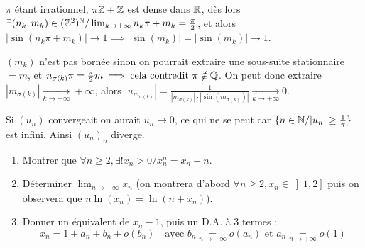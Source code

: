 \begin{solution}
$\pi$ étant irrationnel, $\pi \mathbb Z + \mathbb Z$ est dense dans $\mathbb R$, dès lors $\exists (n_k, m_k) \in (\mathbb Z^2)^\mathbb N / \lim_{k \to +\infty} n_k \pi + m_k = \frac{\pi}{2}$,
et alors $|\sin(n_k \pi + m_k)| \to 1 \implies |\sin(m_k)| = |\sin(m_k)| \to 1$.

$(m_k)$ n'est pas bornée sinon on pourrait extraire une sous-suite stationnaire $= m$, et $n_{\sigma(k)} \pi = \frac{\pi}{2} m \implies \text{cela contredit } \pi \notin \mathbb Q$.
On peut donc extraire $|m_{\sigma(k)}| \xrightarrow[k \to +\infty]{} +\infty$, alors $|u_{m_{\sigma(k)}}| = \frac{1}{|m_{\sigma(k)}| \cdot |\sin(m_{\sigma(k)})|} \xrightarrow[k \to +\infty]{} 0$.

Si $(u_n)$ convergeait on aurait $u_n \to 0$, ce qui ne se peut car $\{ n \in \mathbb N / |u_n| \geq \frac{1}{\pi} \}$ est infini.
Ainsi $(u_n)_n$ diverge.
\end{solution}


\begin{statementbox}
\begin{enumerate}[label=\alph*)]
  \item Montrer que $\forall n \geq 2, \exists! x_n > 0 / x_n^n = x_n + n$.
  \item Déterminer $\lim_{n \to +\infty} x_n$ (on montrera d'abord $\forall n \geq 2, x_n \in \left] 1, 2 \right]$ puis on observera que $n \ln(x_n) = \ln(n + x_n)$).
  \item Donner un équivalent de $x_n - 1$, puis un D.A. à 3 termes :
  \[
  x_n = 1 + a_n + b_n + o(b_n) \quad \text{avec } b_n \underset{n \to +\infty}{=} o(a_n) \text{ et } a_n \underset{n \to +\infty}{=} o(1)
  \]
\end{enumerate}
\end{statementbox}

